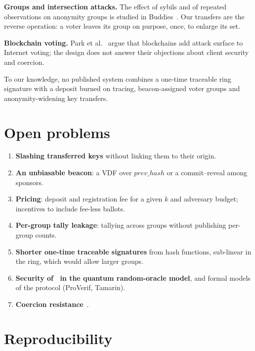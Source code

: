 \documentclass[11pt,a4paper]{article}
\theoremstyle{definition}
\begin{document}
\textbf{Groups and intersection attacks.} The effect of sybils and of
repeated observations on anonymity groups is studied in
Buddies~\cite{Buddies2013}. Our transfers are the reverse operation: a
voter leaves its group on purpose, once, to enlarge its set.

\textbf{Blockchain voting.} Park et al.~\cite{ParkSpecter2021} argue that
blockchains add attack surface to Internet voting; the design does not
answer their objections about client security and coercion.

To our knowledge, no published system combines a one-time traceable ring
signature with a deposit burned on tracing, beacon-assigned voter groups
and anonymity-widening key transfers.

\section{Open problems}
\label{sec:future}

\begin{enumerate}[leftmargin=*]
\item \textbf{Slashing transferred keys} without linking them to their
      origin.
\item \textbf{An unbiasable beacon}: a VDF over $\mathit{prev\_hash}$ or a
      commit--reveal among sponsors.
\item \textbf{Pricing}: deposit and registration fee for a given $k$ and
      adversary budget; incentives to include fee-less ballots.
\item \textbf{Per-group tally leakage}: tallying across groups without
      publishing per-group counts.
\item \textbf{Shorter one-time traceable signatures} from hash functions,
      sub-linear in the ring, which would allow larger groups.
\item \textbf{Security of~\cite{SZ21} in the quantum random-oracle
      model}, and formal models of the protocol (ProVerif, Tamarin).
\item \textbf{Coercion resistance}~\cite{JCJ2005,Civitas2008}.
\end{enumerate}

\section{Reproducibility}
\label{sec:repro}
\end{document}
